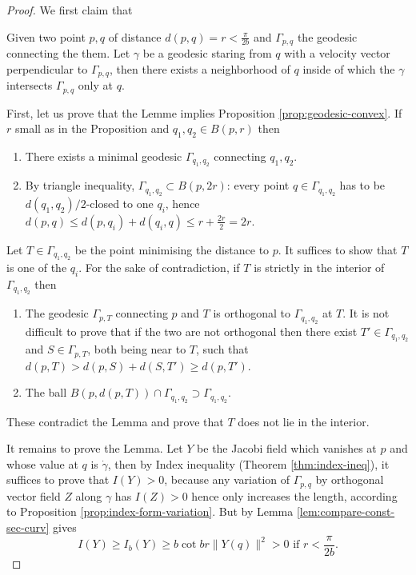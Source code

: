 \begin{proof}
We first claim that
\begin{lemma}
Given two point \(p,q\) of distance \(d(p,q) = r < \frac{\pi}{2b}\) and \(\Gamma_{p,q}\) the geodesic connecting the them. Let \(\gamma\) be a geodesic staring
from \(q\) with a velocity vector perpendicular to \(\Gamma_{p,q}\), then there exists
a neighborhood of \(q\) inside of which the \(\gamma\) intersects \(\Gamma_{p,q}\)
only at \(q\).
\end{lemma}

First, let us prove that the Lemme implies Proposition \ref{prop:geodesic-convex}. If \(r\) small as in the Proposition and \(q_1, q_2\in B(p,r)\) then
\begin{enumerate}
\item There exists a minimal geodesic \(\Gamma_{q_1,q_2}\) connecting \(q_1, q_2\).
\item By triangle inequality, \(\Gamma_{q_1, q_2}\subset B(p,2r)\): every point \(q\in
   \Gamma_{q_1,q_2}\) has to be \(d(q_1,q_2)/2\)-closed to one \(q_i\), hence \(d(p,q)\leq d(p,q_i) + d(q_i,q) \leq r + \frac{2r}{2} = 2r\).
\end{enumerate}
Let \(T \in \Gamma_{q_1, q_2}\) be the point minimising the distance to \(p\). It
suffices to show that \(T\) is one of the \(q_i\). For the sake of contradiction, if
\(T\) is strictly in the interior of \(\Gamma_{q_1,q_2}\) then
\begin{enumerate}
\item The geodesic \(\Gamma_{p,T}\) connecting \(p\) and \(T\) is orthogonal to \(\Gamma_{q_1,q_2}\) at \(T\). It is not difficult to prove that if the two are not
orthogonal then there exist \(T'\in \Gamma_{q_1,q_2}\) and \(S\in \Gamma_{p,T}\),
both being near to \(T\), such that \(d(p,T) > d(p, S) + d(S,T') \geq d(p,T')\).
\item The ball \(B(p,d(p,T))\cap \Gamma_{q_1,q_2} \supset \Gamma_{q_1,q_2}\).
\end{enumerate}

These contradict the Lemma and prove that \(T\) does not lie in the interior.

It remains to prove the Lemma. Let \(Y\) be the Jacobi field which vanishes at \(p\)
and whose value at \(q\) is \(\dot\gamma\), then by Index inequality (Theorem
\ref{thm:index-ineq}), it suffices to prove that \(I(Y)>0\), because any variation of \(\Gamma_{p,q}\) by orthogonal vector field \(Z\) along \(\gamma\) has \(I(Z) >0\) hence only increases the length,
according to Proposition \ref{prop:index-form-variation}. But by Lemma
\ref{lem:compare-const-sec-curv} gives
\[
 I(Y) \geq I_b(Y) \geq b\cot br \| Y(q) \|^2 >0 \text{ if } r < \frac{\pi}{2b}.
\]
\end{proof}


